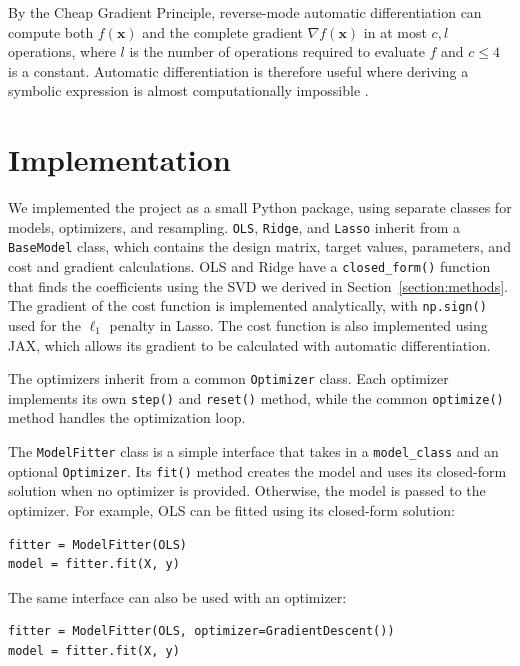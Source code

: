 \documentclass[amssymb,twocolumn,aps]{revtex4}
\begin{document}
By the Cheap Gradient Principle, reverse-mode automatic differentiation can compute both $f(\boldsymbol{x})$ and the complete gradient $\nabla f(\boldsymbol{x})$ in at most $c,l$ operations, where $l$ is the number of operations required to evaluate $f$ and $c\leq4$ is a constant. Automatic differentiation is therefore useful where deriving a symbolic expression is almost computationally impossible \cite{lecturebook}.


\section{Implementation}\label{section:Implementation}

We implemented the project as a small Python package, using separate classes for models, optimizers, and resampling. \texttt{OLS}, \texttt{Ridge}, and \texttt{Lasso} inherit from a \texttt{BaseModel} class, which contains the design matrix, target values, parameters, and cost and gradient calculations. OLS and Ridge have a \texttt{closed\_form()} function that finds the coefficients using the SVD we derived in Section~\ref{section:methods}. The gradient of the cost function is implemented analytically, with \texttt{np.sign()} used for the $\ell_1$ penalty in Lasso. The cost function is also implemented using JAX, which allows its gradient to be calculated with automatic differentiation.

The optimizers inherit from a common \texttt{Optimizer} class. Each optimizer implements its own \texttt{step()} and \texttt{reset()} method, while the common \texttt{optimize()} method handles the optimization loop.

The \texttt{ModelFitter} class is a simple interface that takes in a \texttt{model\_class} and an optional \texttt{Optimizer}. Its \texttt{fit()} method creates the model and uses its closed-form solution when no optimizer is provided. Otherwise, the model is passed to the optimizer. For example, OLS can be fitted using its closed-form solution:

{\footnotesize
\begin{verbatim}
fitter = ModelFitter(OLS)
model = fitter.fit(X, y)
\end{verbatim}
}

The same interface can also be used with an optimizer:

{\footnotesize
\begin{verbatim}
fitter = ModelFitter(OLS, optimizer=GradientDescent())
model = fitter.fit(X, y)
\end{verbatim}
}
\end{document}
